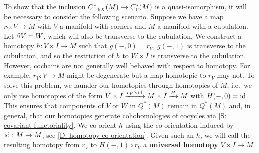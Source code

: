To show that the inclusion $C^*_{\Gamma \pitchfork X}(M)\hookrightarrow C^*_\Gamma(M)$ is a quasi-isomorphism, it will be necessary to consider the following scenario. Suppose we have a map $r_V:V\to M$ with $V$ a manifold with corners and $M$ a manifold with a cubulation. Let $\partial V=W$, which will also be transverse to the cubulation. We construct a homotopy $h:V\times I\to M$ such that $g(-,0)=r_V$, $g(-,1)$ is transverse to the cubulation, and so the restriction of $h$ to $W\times I$ is transverse to the cubulation. 
However, cochains are not generally well behaved with respect to homotopy. For example, $r_V:V\to M$ might be degenerate but a map homotopic to $r_V$ may not. To solve this problem, we launder our homotopies through homotopies of $M$, i.e.\ we only use homotopies of the form $V\times I\xrightarrow{r_V\times \mathrm{id}} M\times I\xrightarrow{H} M$ with $H(-,0)=\mathrm{id}$. This ensures that components of $V$ or $W$ in $Q^*(M)$ remain in $Q^*(M)$ and, in general, that our homotopies generate cohohomologies of cocycles via 
\cref{S: covariant functoriality}. We co-orient $h$ using the co-orientation induced by $\mathrm{id}:M\to M$; see \cref{D: homotopy co-orientation}. Given such an $h$, we will call the resulting homotopy from $r_V$ to $H(-,1)\circ r_V$ a \textbf{universal homotopy} $V\times I\to M$. 


